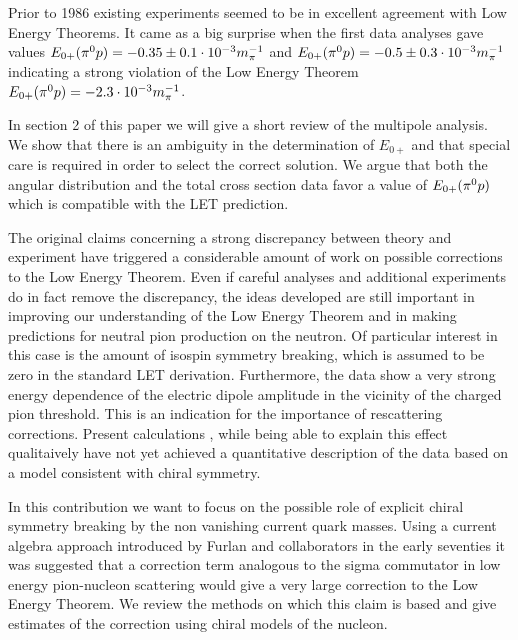 Prior to 1986 existing experiments seemed to be in excellent agreement with 
Low Energy Theorems. It came as a big surprise when the first
data analyses gave values \cite{Maz86,Bec89} $E_{0+}(\pi^0 p)=-0.35\pm 0.1 \cdot 10^{-3} m_\pi^{-1}$ and
$E_{0+}(\pi^0 p)=-0.5\pm 0.3\cdot 10^{-3} m_\pi^{-1}$ indicating a strong violation of the 
Low Energy Theorem 
$
E_{0+}(\pi^0 p) = -2.3 \cdot 10^{-3} m_\pi^{-1} 
$.

In section 2 of this paper we will give a short review of the
multipole analysis. We show that there is an ambiguity in the
determination of $E_{0+}$  and that special care
is required in order to select the correct  solution. We argue
that both the angular distribution and the total cross section
data favor a value of $E_{0+}(\pi^0 p)$ which is compatible with the
LET prediction. 

The original claims concerning a strong discrepancy between theory
and experiment have triggered a considerable amount of work on
possible corrections to the Low Energy Theorem.
Even if careful analyses and additional experiments do
in fact remove the discrepancy, the ideas developed are still important
in improving our understanding of the Low Energy Theorem and in
making predictions for neutral pion production on the neutron.
Of particular interest in this case is the amount of isospin
symmetry breaking, which is assumed to be zero in the standard
LET derivation. Furthermore, the data show a very strong energy
dependence of the electric dipole amplitude in the vicinity of
the charged pion threshold. This is an indication for the importance
of rescattering corrections. Present calculations \cite{LYL91},
while being able to explain this effect qualitaively have not yet 
achieved a quantitative description of the data based on a model 
consistent with chiral symmetry.
     
In this contribution we want to focus on the possible
role  of explicit chiral symmetry breaking by  the non vanishing 
current quark masses. Using a current algebra approach introduced
by Furlan and collaborators \cite{FPV74} in the early seventies it 
was suggested \cite{NS89} that a correction term analogous to the 
sigma commutator in low energy pion-nucleon scattering would give
a very large correction to the Low Energy Theorem. We review
the methods on which this claim is based and give estimates
of the correction using  chiral models of the nucleon.
  
